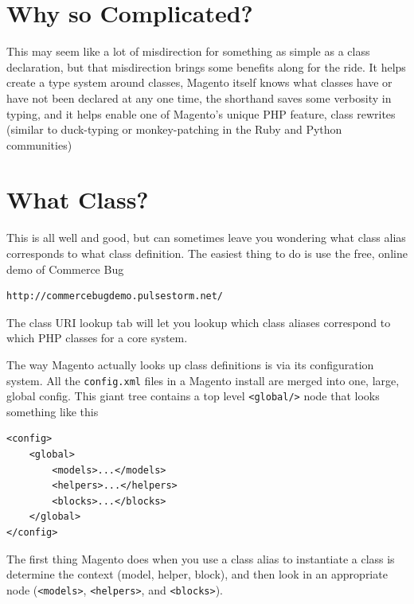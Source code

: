 \documentclass[oneside]{book}
\begin{document}
\section{Why so Complicated?}

This may seem like a lot of misdirection for something as simple as a class declaration, but that misdirection brings some benefits along for the ride.  It helps create a type system around classes, Magento itself knows what classes have or have not been declared at any one time, the shorthand saves some verbosity in typing, and it helps enable one of Magento's unique PHP feature, class rewrites (similar to duck-typing or monkey-patching in the Ruby and Python communities)

\section{What Class?}

This is all well and good, but can sometimes leave you wondering what class alias corresponds to what class definition.  The easiest thing to do is use the free, online demo of Commerce Bug

\begin{lstlisting}
http://commercebugdemo.pulsestorm.net/

\end{lstlisting}


The class URI lookup tab will let you lookup which class aliases correspond to which PHP classes for a core system.

The way Magento actually looks up class definitions is via its configuration system.  All the \footnotesize\texttt{config.xml} \normalsize  files in a Magento install are merged into one, large, global config.  This giant tree contains a top level \footnotesize\texttt{\textless global/\textgreater } \normalsize  node that looks something like this

\begin{lstlisting}
<config>
    <global>
        <models>...</models>
        <helpers>...</helpers>
        <blocks>...</blocks>
    </global>
</config>

\end{lstlisting}


The first thing Magento does when you use a class alias to instantiate a class is determine the context (model, helper, block), and then look in an appropriate node (\footnotesize\texttt{\textless models\textgreater }\normalsize, \footnotesize\texttt{\textless helpers\textgreater }\normalsize, and \footnotesize\texttt{\textless blocks\textgreater }\normalsize).
\end{document}

